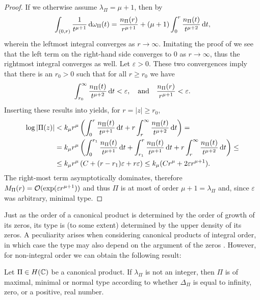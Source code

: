 \begin{proof}
    If we otherwise assume $\lambda_\Pi = \mu + 1$, then by 
    $$ \int_{(0, r)} \frac{1}{t^{\mu + 1}} \mathop{}\!\mathrm{d} \omega_\Pi(t) = \frac{n_\Pi(r)}{r^{\mu + 1}} + (\mu + 1) \int_0^r \frac{n_\Pi(t)}{t^{\mu + 2}} \mathop{}\!\mathrm{d} t, $$
    wherein the leftmost integral converges as $r \to \infty$. Imitating the proof of  we see that the left term on the right-hand side converges to $0$ as $r \to \infty$, thus the rightmost integral converges as well. Let $\varepsilon > 0$. These two convergences imply that there is an $r_0 > 0$ such that for all $r \geq r_0$ we have
    $$ \int_{r_0}^\infty \frac{n_\Pi(t)}{t^{\mu + 2}} \mathop{}\!\mathrm{d} t < \varepsilon, \quad \textrm{and} \quad \frac{n_\Pi(r)}{r^{\mu + 1}} < \varepsilon. $$
    Inserting these results into  yields, for $r = \vert z \vert \geq r_0$,
    \begin{align*}
        \log \vert \Pi(z) \vert &< k_\mu r^\mu \left( \int_0^r \frac{n_\Pi(t)}{t^{\mu + 1}} \mathop{}\!\mathrm{d} t + r \int_r^\infty \frac{n_\Pi(t)}{t^{\mu + 2}} \mathop{}\!\mathrm{d} t \right) = \\
        &= k_\mu r^\mu \left( \int_0^{r_1} \frac{n_\Pi(t)}{t^{\mu + 1}} \mathop{}\!\mathrm{d} t + \int_{r_1}^r \frac{n_\Pi(t)}{t^{\mu + 1}} \mathop{}\!\mathrm{d} t + r \int_r^\infty \frac{n_\Pi(t)}{t^{\mu + 2}} \mathop{}\!\mathrm{d} t \right) \leq \\
        &\leq k_\mu r^\mu \left(C + (r - r_1) \varepsilon + r \varepsilon \right) \leq k_\mu (C r^\mu + 2 \varepsilon r^{\mu + 1}).
    \end{align*}
    The right-most term asymptotically dominates, therefore $M_\Pi(r) = \mathcal{O}(\exp(\varepsilon r^{\mu + 1}))$ and thus $\Pi$ is at most of order $\mu + 1 = \lambda_\Pi$ and, since $\varepsilon$ was arbitrary, minimal type.
\end{proof}

Just as the order of a canonical product is determined by the order of growth of its zeros, its type is (to some extent) determined by the upper density of its zeros. A peculiarity arises when considering canonical products of integral order, in which case the type may also depend on the argument of the zeros \cite{levin-distribution-of-zeros}. However, for non-integral order we can obtain the following result:

\begin{theorem} \label{thm:canonical-product-type-density}
    Let $\Pi \in H(\mathbb{C})$ be a canonical product. If $\lambda_\Pi$ is not an integer, then $\Pi$ is of maximal, minimal or normal type according to whether $\Delta_\Pi$ is equal to infinity, zero, or a positive, real number.
\end{theorem}

